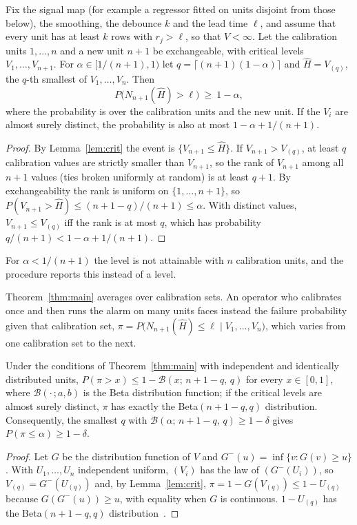 \begin{theorem}\label{thm:main}
Fix the signal map (for example a regressor fitted on units disjoint from those below), the smoothing, the debounce $k$ and the lead time $\ell$, and assume that every unit has at least $k$ rows with $r_j>\ell$, so that $V<\infty$. Let the calibration units $1,\dots,n$ and a new unit $n+1$ be exchangeable, with critical levels $V_1,\dots,V_{n+1}$. For $\alpha\in[1/(n+1),1)$ let $q=\lceil (n+1)(1-\alpha)\rceil$ and $\hat H=V_{(q)}$, the $q$-th smallest of $V_1,\dots,V_n$. Then
\begin{equation}\label{eq:guarantee}
P\bigl(N_{n+1}(\hat H)>\ell\bigr)\ \ge\ 1-\alpha ,
\end{equation}
where the probability is over the calibration units and the new unit. If the $V_i$ are almost surely distinct, the probability is also at most $1-\alpha+1/(n+1)$.
\end{theorem}
\begin{proof}
By Lemma~\ref{lem:crit} the event is $\{V_{n+1}\le \hat H\}$. If $V_{n+1}>V_{(q)}$, at least $q$ calibration values are strictly smaller than $V_{n+1}$, so the rank of $V_{n+1}$ among all $n+1$ values (ties broken uniformly at random) is at least $q+1$. By exchangeability the rank is uniform on $\{1,\dots,n+1\}$, so $P(V_{n+1}>\hat H)\le (n+1-q)/(n+1)\le\alpha$. With distinct values, $V_{n+1}\le V_{(q)}$ iff the rank is at most $q$, which has probability $q/(n+1)<1-\alpha+1/(n+1)$.
\end{proof}

For $\alpha<1/(n+1)$ the level is not attainable with $n$ calibration units, and the procedure reports this instead of a level.

Theorem~\ref{thm:main} averages over calibration sets. An operator who calibrates once and then runs the alarm on many units faces instead the failure probability given that calibration set, $\pi=P\bigl(N_{n+1}(\hat H)\le\ell\mid V_1,\dots,V_n\bigr)$, which varies from one calibration set to the next.

\begin{corollary}\label{cor:pac}
Under the conditions of Theorem~\ref{thm:main} with independent and identically distributed units, $P(\pi>x)\le 1-\mathcal B(x;\,n+1-q,\,q)$ for every $x\in[0,1]$, where $\mathcal B(\cdot\,;a,b)$ is the Beta distribution function; if the critical levels are almost surely distinct, $\pi$ has exactly the Beta$(n+1-q,q)$ distribution. Consequently, the smallest $q$ with $\mathcal B(\alpha;\,n+1-q,\,q)\ge1-\delta$ gives $P(\pi\le\alpha)\ge1-\delta$.
\end{corollary}
\begin{proof}
Let $G$ be the distribution function of $V$ and $G^{-}(u)=\inf\{v:G(v)\ge u\}$. With $U_1,\dots,U_n$ independent uniform, $(V_i)$ has the law of $(G^{-}(U_i))$, so $V_{(q)}=G^{-}(U_{(q)})$ and, by Lemma~\ref{lem:crit}, $\pi=1-G(V_{(q)})\le 1-U_{(q)}$ because $G(G^{-}(u))\ge u$, with equality when $G$ is continuous. $1-U_{(q)}$ has the Beta$(n+1-q,q)$ distribution~\cite{vovk2012}.
\end{proof}

